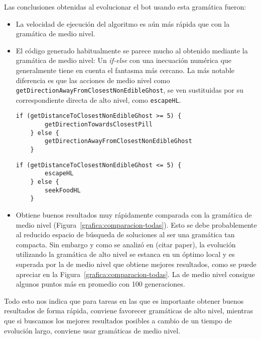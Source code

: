 Las conclusiones obtenidas al evolucionar el bot usando esta gramática fueron:
\begin{itemize}
\item La velocidad de ejecución del algoritmo es aún más rápida que con la gramática de medio nivel.

\item El código generado habitualmente se parece mucho al obtenido mediante la gramática de medio nivel: Un \textit{if-else} con una inecuación numérica que generalmente tiene en cuenta el fantasma más cercano. La más notable diferencia es que las acciones de medio nivel como \texttt{getDirectionAwayFromClosestNonEdibleGhost}, se ven sustituidas por su correspondiente directa de alto nivel, como \texttt{escapeHL}.
\begin{lstlisting}[frame=single, breaklines=no, basicstyle=\fontsize{10}{11}\ttfamily, caption=Código del mejor individuo obtenido en una población evolucionada con la gramática de medio nivel.]
    if (getDistanceToClosestNonEdibleGhost >= 5) {
        getDirectionTowardsClosestPill
    } else {
        getDirectionAwayFromClosestNonEdibleGhost
    }
\end{lstlisting}

\begin{lstlisting}[frame=single, breaklines=no, basicstyle=\fontsize{10}{11}\ttfamily, caption=Código del mejor individuo obtenido en una población evolucionada con la gramática de alto nivel.]
    if (getDistanceToClosestNonEdibleGhost <= 5) {
        escapeHL
    } else {
        seekFoodHL
    }
\end{lstlisting}

\item Obtiene buenos resultados muy rápidamente comparada con la gramática de medio nivel (Figura~\ref{grafica:comparacion-todas}). Esto se debe probablemente al reducido espacio de búsqueda de soluciones al ser una gramática tan compacta. Sin embargo y como se analizó en (citar paper),  la evolución utilizando la gramática de alto nivel se estanca en un óptimo local y es superada por la de medio nivel que obtiene mejores resultados, como se puede apreciar en la Figura~\ref{grafica:comparacion-todas}. La de medio nivel consigue algunos puntos más en promedio con 100 generaciones.
\end{itemize}

Todo esto nos indica que para tareas en las que es importante obtener buenos resultados de forma rápida, conviene favorecer gramáticas de alto nivel, mientras que si buscamos los mejores resultados posibles a cambio de un tiempo de evolución largo, conviene usar gramáticas de medio nivel.


